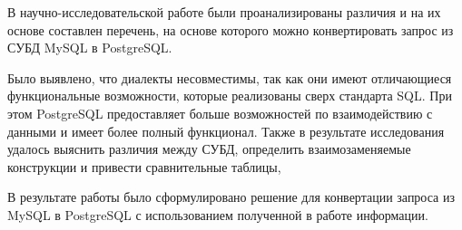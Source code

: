 \Conclusion %
 
В научно-исследовательской работе были проанализированы различия и на их основе составлен перечень, 
на основе которого можно конвертировать запрос из СУБД MySQL в PostgreSQL.

Было выявлено, что диалекты несовместимы, так как они имеют отличающиеся функциональные возможности, которые
реализованы сверх стандарта SQL. При этом PostgreSQL предоставляет больше возможностей по взаимодействию с данными 
и имеет более полный функционал.  
Также в результате исследования удалось выяснить различия между СУБД, определить
взаимозаменяемые конструкции и привести сравнительные таблицы,

В результате работы было сформулировано решение для конвертации запроса из MySQL в PostgreSQL 
с использованием полученной в работе информации. 

 
 

